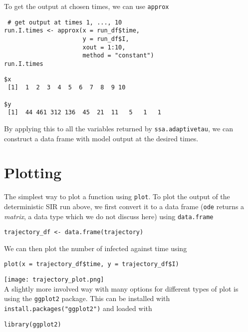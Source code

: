 \documentclass[11pt,a4paper]{article}
\begin{document}
To get the output at chosen times, we can use \texttt{approx} \\

\begin{verbatim}
 # get output at times 1, ..., 10
run.I.times <- approx(x = run_df$time,
                      y = run_df$I,
                      xout = 1:10,
                      method = "constant")
run.I.times
\end{verbatim}

\begin{verbatim}
$x
 [1]  1  2  3  4  5  6  7  8  9 10

$y
 [1]  44 461 312 136  45  21  11   5   1   1
\end{verbatim}

By applying this to all the variables returned by \texttt{ssa.adaptivetau}, we can construct a data frame with model output at the desired times. \\

\section{Plotting}
\label{sec-7}
The simplest way to plot a function using \texttt{plot}. To plot the output of the deterministic SIR run above, we first convert it to a data frame (\texttt{ode} returns a \emph{matrix}, a data type which we do not discuss here) using \texttt{data.frame} \\

\begin{verbatim}
trajectory_df <- data.frame(trajectory)
\end{verbatim}

We can then plot the number of infected against time using \\

\begin{verbatim}
plot(x = trajectory_df$time, y = trajectory_df$I)
\end{verbatim}

\texttt{[image: trajectory\_plot.png]} \\

A slightly more involved way with many options for different types of plot is using the \texttt{ggplot2} package. This can be installed with \texttt{install.packages("ggplot2")} and loaded with \\

\begin{verbatim}
library(ggplot2)
\end{verbatim}
\end{document}
